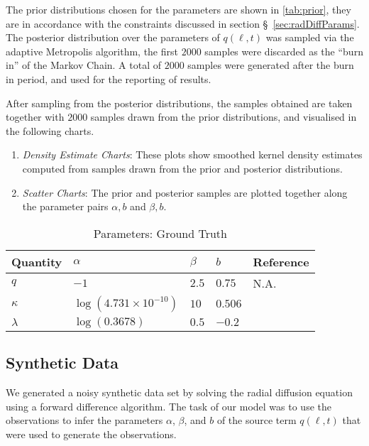 The prior distributions chosen for the parameters are shown in \cref{tab:prior}, they are in 
accordance with the constraints discussed in section \S~\ref{sec:radDiffParams}. The posterior 
distribution over the parameters of $q(\ell, t)$ was sampled via the adaptive Metropolis algorithm, 
the first $2000$ samples were discarded as the \enquote{burn in} of the Markov Chain. A total of 
$2000$ samples were generated after the burn in period, and used for the reporting of results.

After sampling from the posterior distributions, the samples obtained are taken together with 
$2000$ samples drawn from the prior distributions, and visualised in the following charts.
\begin{enumerate}
  \item \emph{Density Estimate Charts}: These plots show smoothed kernel density estimates computed 
        from samples drawn from the prior and posterior distributions.
  \item \emph{Scatter Charts}: The prior and posterior samples are plotted together along the 
        parameter pairs $\alpha, b$ and $\beta, b$.
\end{enumerate}


\begin{table}[ht]
  \caption{Parameters: Ground Truth}
  \label{tab:ground-truth}
  \centering
  \begin{tabular}{lllll}
    \hline
    \textbf{Quantity}  & $\alpha$ & $\beta$ & $b$ & Reference\\
    \hline
    $q$ & $-1$  & $2.5$ & $0.75$ & N.A. \\
    $\kappa$  & $\log(4.731 \times 10^{-10})$ & $10$ & $0.506$ & \citet{JGRA:JGRA15067} \\
    $\lambda$ & $\log(0.3678)$ & $0.5$ & $-0.2$ & \citet{GRL:GRL22815} \\
    \hline
  \end{tabular}
\end{table}

\subsection{Synthetic Data}\label{sec:syntheticDataQ}

We generated a noisy synthetic data set by solving the radial diffusion equation using a 
forward difference algorithm. The task of our model was to use the observations to infer the 
parameters $\alpha$, $\beta$, and $b$ of the source term $q(\ell, t)$ that were used to generate 
the observations.


